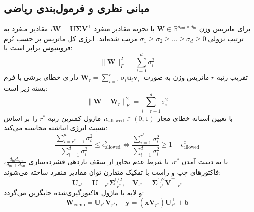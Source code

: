 \subsection{مبانی نظری و فرمول‌بندی ریاضی}
برای ماتریس وزن $\mathbf{W} \in \mathbb{R}^{d_{\text{out}} \times d_{\text{in}}}$ با تجزیه مقادیر منفرد $\mathbf{W} = \mathbf{U} \mathbf{\Sigma} \mathbf{V}^\top$، مقادیر منفرد به ترتیب نزولی $\sigma_1 \ge \sigma_2 \ge \dots \ge \sigma_d \ge 0$ مرتب شده‌اند. انرژی کل ماتریس بر حسب نُرم فروبنیوس برابر است با:
\begin{equation}
\|\mathbf{W}\|_F^2 = \sum_{i=1}^d \sigma_i^2
\end{equation}
تقریب رتبه $r$ ماتریس وزن به صورت $\mathbf{W}_r = \sum_{i=1}^r \sigma_i \mathbf{u}_i \mathbf{v}_i^\top$ دارای خطای برشی با فرم بسته زیر است:
\begin{equation}
\|\mathbf{W} - \mathbf{W}_r\|_F^2 = \sum_{i=r+1}^d \sigma_i^2
\end{equation}
با تعیین آستانه خطای مجاز $\epsilon_{\text{allowed}} \in (0, 1)$، ماژول کمترین رتبه $r^*$ را بر اساس نسبت انرژی انباشته محاسبه می‌کند:
\begin{equation}
\frac{\sum_{i=r^*+1}^d \sigma_i^2}{\sum_{i=1}^d \sigma_i^2} \le \epsilon_{\text{allowed}}^2 \iff \frac{\sum_{i=1}^{r^*} \sigma_i^2}{\sum_{i=1}^d \sigma_i^2} \ge 1 - \epsilon_{\text{allowed}}^2
\end{equation}
با به دست آمدن $r^*$، با شرط عدم تجاوز از سقف بازدهی فشرده‌سازی $\frac{d_{\text{in}} d_{\text{out}}}{d_{\text{in}} + d_{\text{out}}}$، فاکتورهای چپ و راست با تفکیک متقارن توان مقادیر منفرد ساخته می‌شوند:
\begin{equation}
\mathbf{U}_{r^*} = \mathbf{U}_{:, :r^*} \mathbf{\Sigma}_{:r^*}^{1/2}, \quad \mathbf{V}_{r^*} = \mathbf{\Sigma}_{:r^*}^{1/2} \mathbf{V}_{:, :r^*}^\top
\end{equation}
و لایه با ماژول فاکتورگیری‌شده جایگزین می‌گردد:
\begin{equation}
\mathbf{W}_{\text{comp}} = \mathbf{U}_{r^*} \mathbf{V}_{r^*}, \quad \mathbf{y} = (\mathbf{x} \mathbf{V}_{r^*}^\top) \mathbf{U}_{r^*}^\top + \mathbf{b}
\end{equation}

